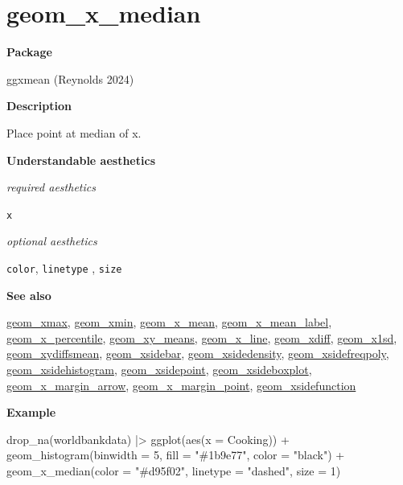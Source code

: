 \documentclass[
  letterpaper,
  DIV=11,
  numbers=noendperiod]{scrreprt}
\newenvironment{Shaded}{\begin{snugshade}}{\end{snugshade}}
\newcommand{\AttributeTok}[1]{\textcolor[rgb]{0.40,0.45,0.13}{#1}}
\newcommand{\DecValTok}[1]{\textcolor[rgb]{0.68,0.00,0.00}{#1}}
\newcommand{\FunctionTok}[1]{\textcolor[rgb]{0.28,0.35,0.67}{#1}}
\newcommand{\NormalTok}[1]{\textcolor[rgb]{0.00,0.23,0.31}{#1}}
\newcommand{\SpecialCharTok}[1]{\textcolor[rgb]{0.37,0.37,0.37}{#1}}
\newcommand{\StringTok}[1]{\textcolor[rgb]{0.13,0.47,0.30}{#1}}
\begin{document}
\section{geom\_x\_median}\label{x_median}

\textbf{Package}

ggxmean (Reynolds 2024)

\textbf{Description}

Place point at median of x.

\textbf{Understandable aesthetics}

\emph{required aesthetics}

\texttt{x}

\emph{optional aesthetics}

\texttt{color}, \texttt{linetype} , \texttt{size}

\textbf{See also}

\href{@xmax}{geom\_xmax}, \href{@xmin}{geom\_xmin},
\href{@x_mean}{geom\_x\_mean},
\href{@x_mean_label}{geom\_x\_mean\_label},
\href{@x_percentile}{geom\_x\_percentile},
\href{@xy_means}{geom\_xy\_means}, \href{@x_line}{geom\_x\_line},
\href{@xdiff}{geom\_xdiff}, \href{@x1sd}{geom\_x1sd},
\href{@xydiffsmean}{geom\_xydiffsmean},
\href{@xsidebar}{geom\_xsidebar},
\href{@xsidedensity}{geom\_xsidedensity},
\href{@xsidefreqpoly}{geom\_xsidefreqpoly},
\href{@xsidehistogram}{geom\_xsidehistogram},
\href{@xsidepoint}{geom\_xsidepoint},
\href{@xsideboxplot}{geom\_xsideboxplot},
\href{@x_margin_arrow}{geom\_x\_margin\_arrow},
\href{@x_margin_point}{geom\_x\_margin\_point},
\href{@xsidefunction}{geom\_xsidefunction}

\textbf{Example}

\begin{Shaded}
\begin{Highlighting}[]
\FunctionTok{drop\_na}\NormalTok{(worldbankdata) }\SpecialCharTok{|\textgreater{}}
\FunctionTok{ggplot}\NormalTok{(}\FunctionTok{aes}\NormalTok{(}\AttributeTok{x =}\NormalTok{ Cooking)) }\SpecialCharTok{+}
  \FunctionTok{geom\_histogram}\NormalTok{(}\AttributeTok{binwidth =} \DecValTok{5}\NormalTok{, }\AttributeTok{fill =} \StringTok{"\#1b9e77"}\NormalTok{, }\AttributeTok{color =} \StringTok{"black"}\NormalTok{) }\SpecialCharTok{+} 
  \FunctionTok{geom\_x\_median}\NormalTok{(}\AttributeTok{color =} \StringTok{"\#d95f02"}\NormalTok{, }\AttributeTok{linetype =} \StringTok{"dashed"}\NormalTok{, }\AttributeTok{size =} \DecValTok{1}\NormalTok{) }
\end{Highlighting}
\end{Shaded}
\end{document}

